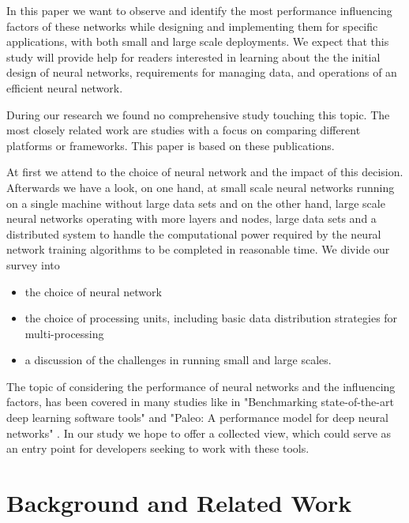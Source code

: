 \documentclass[conference]{IEEEtran}
\begin{document}
In this paper we want to observe and identify the most performance influencing factors of these networks while designing and implementing them for specific applications, with both small and large scale deployments.
We expect that this study will provide help for readers interested in learning about the the initial design of neural networks, requirements for managing data, and operations of an efficient neural network.

During our research we found no comprehensive study touching this topic. The most closely related work are studies with a focus on comparing different platforms or frameworks. This paper is based on these publications.

 At first we attend to the choice of neural network and the impact of this decision. Afterwards we have a look, on one hand, at small scale neural networks running on a single machine without large data sets and on the other hand, large scale neural networks operating with more layers and nodes, large data sets and a distributed system to handle the computational power required by the neural network training algorithms to be completed in reasonable time. We divide our survey into
\begin{itemize}
\item the choice of neural network
\item the choice of processing units, including basic data distribution strategies for multi-processing
\item a discussion of the challenges in running small and large scales.
\end{itemize}


The topic of considering the performance of neural networks and the influencing factors, has been covered in many studies like
 in "Benchmarking state-of-the-art deep learning software tools" \cite{shi2016benchmarking} and "Paleo: A performance model for deep neural networks" \cite{qi2016paleo}. In our study we hope to offer a collected view, which could serve as an entry point for developers seeking to work with these tools.


\section{Background and Related Work}
\end{document}
